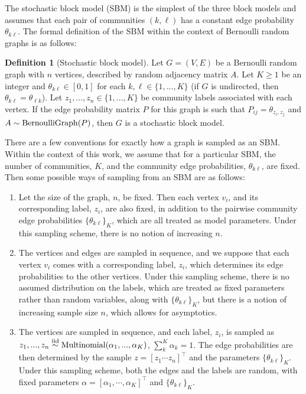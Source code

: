 \documentclass[
  12pt,
]{article}
\theoremstyle{definition}
\newtheorem{definition}{Definition}[section]
\theoremstyle{definition}
\theoremstyle{definition}
\theoremstyle{definition}
\theoremstyle{remark}
\begin{document}
The stochastic block model (SBM) \citep{doi:10.1080/0022250X.1971.9989788} is the simplest of the three block models and assumes that each pair of communities \((k, \ell)\) has a constant edge probability \(\theta_{k \ell}\).
The formal definition of the SBM within the context of Bernoulli random graphs is as follows:

\begin{definition}[Stochastic block model]
\label{def:sbm}
Let $G = (V, E)$ be a Bernoulli random graph with $n$ vertices, described by random adjacency matrix $A$. 
Let $K \geq 1$ be an integer and $\theta_{k \ell} \in [0, 1]$ for each $k, \ell \in \{1, ..., K\}$ (if $G$ is undirected, then $\theta_{k \ell} = \theta_{\ell k}$). 
Let $z_1, ..., z_n \in \{1, ..., K\}$ be community labels associated with each vertex. 
If the edge probability matrix $P$ for this graph is such that 
$P_{ij} = \theta_{z_i, z_j}$ and $A \sim \mathrm{BernoulliGraph}(P)$, then $G$ is a stochastic block model. 
\end{definition}

There are a few conventions for exactly how a graph is sampled as an SBM.
Within the context of this work, we assume that for a particular SBM, the number of communities, \(K\), and the community edge probabilities, \(\theta_{k \ell}\), are fixed.
Then some possible ways of sampling from an SBM are as follows:

\begin{enumerate}
\def\labelenumi{\arabic{enumi}.}
\item
  Let the size of the graph, \(n\), be fixed.
  Then each vertex \(v_i\), and its corresponding label, \(z_i\), are also fixed, in addition to the pairwise community edge probabilities \(\{\theta_{k \ell}\}_K\), which are all treated as model parameters.
  Under this sampling scheme, there is no notion of increasing \(n\).
\item
  The vertices and edges are sampled in sequence, and we suppose that each vertex \(v_i\) comes with a corresponding label, \(z_i\), which determines its edge probabilities to the other vertices.
  Under this sampling scheme, there is no assumed distribution on the labels, which are treated as fixed parameters rather than random variables, along with \(\{\theta_{k \ell}\}_K\), but there is a notion of increasing sample size \(n\), which allows for asymptotics.
\item
  The vertices are sampled in sequence, and each label, \(z_i\), is sampled as \(z_1, ..., z_n \stackrel{\mathrm{iid}}{\sim} \mathrm{Multinomial}(\alpha_1, ..., \alpha_K)\), \(\sum_k^K \alpha_k = 1\).
  The edge probabilities are then determined by the sample \(z = [z_1 \cdots z_n]^\top\) and the parameters \(\{\theta_{k \ell}\}_K\).
  Under this sampling scheme, both the edges and the labels are random, with fixed parameters \(\alpha = [ \alpha_1, \cdots, \alpha_K ]^\top\) and \(\{\theta_{k \ell}\}_K\).
\end{enumerate}
\end{document}

